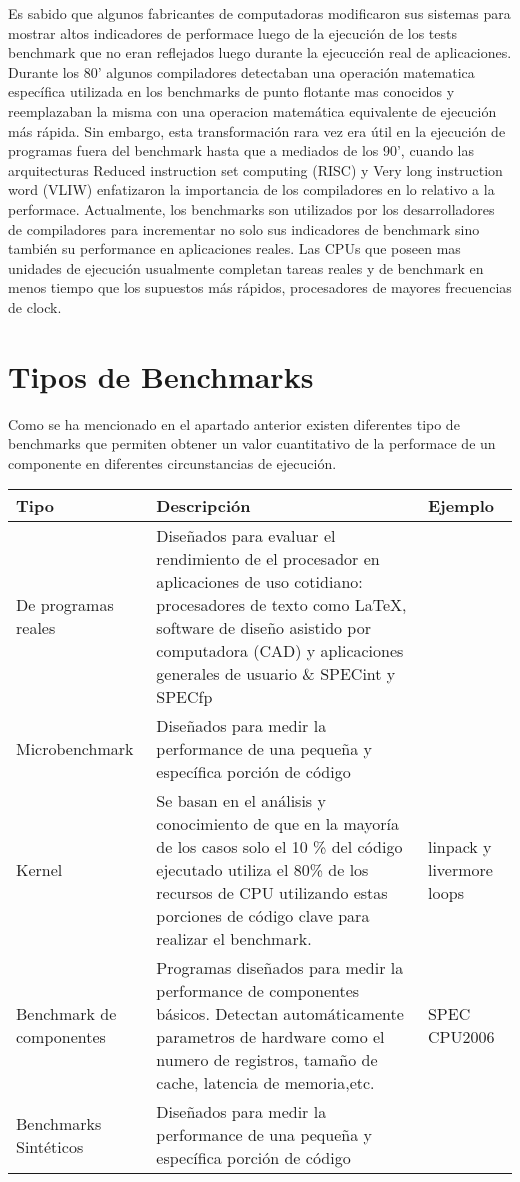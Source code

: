	Es sabido que algunos fabricantes de computadoras modificaron sus sistemas para mostrar altos indicadores de performace luego de la ejecución de los
	tests benchmark que no eran reflejados luego durante la ejecucción real de aplicaciones. Durante los 80' algunos compiladores detectaban una
	operación matematica específica utilizada en los benchmarks de punto flotante mas conocidos y reemplazaban la misma con una operacion matemática
	equivalente de ejecución más rápida. Sin embargo, esta transformación rara vez era útil en la ejecución de programas fuera del benchmark hasta que a
	mediados de los 90', cuando las arquitecturas Reduced instruction set computing (RISC) y Very long instruction word (VLIW) enfatizaron la importancia
	de los compiladores en lo relativo a la performace. Actualmente, los benchmarks son utilizados por los desarrolladores de compiladores para
	incrementar no solo sus indicadores de benchmark sino también su performance en aplicaciones reales. Las CPUs que poseen mas unidades de ejecución
	usualmente completan tareas reales y de benchmark en menos tiempo que los supuestos más rápidos, procesadores de mayores frecuencias de clock.
	
	\section{Tipos de Benchmarks}
	Como se ha mencionado en el apartado anterior existen diferentes tipo de benchmarks que permiten obtener un valor cuantitativo de la performace de un
	componente en diferentes circunstancias de ejecución.
	
		\begin{tabular}{ p{2.5cm} p{8cm} p{3cm} }
		\hline 
		\rowcolor[gray]{0.8} Tipo & Descripción & Ejemplo \\
		\hline
		De programas reales  &  Diseñados para evaluar el rendimiento de el procesador en aplicaciones de uso cotidiano: procesadores de texto
		como \LaTeX, software de diseño asistido por computadora (CAD) y aplicaciones generales de usuario \& SPECint y SPECfp\\
		\hline
		Microbenchmark  &  Diseñados para medir la performance de una pequeña y específica porción de código \\
		\hline
		Kernel			&  Se basan en el análisis y conocimiento de que en la mayoría de los casos solo el 10 \% del código ejecutado utiliza el 80\% de los
		recursos de CPU utilizando estas porciones de código clave para realizar el benchmark.\cite{EtiquetaBM01} & linpack y livermore loops\\
		\hline
		Benchmark de componentes & Programas diseñados para medir la performance de componentes básicos. Detectan automáticamente parametros de hardware
		como el numero de registros, tamaño de cache, latencia de memoria,etc. &  SPEC CPU2006\\
		\hline
		Benchmarks Sintéticos  &  Diseñados para medir la performance de una pequeña y específica porción de código &  \\
		\hline
		
		\end{tabular}
	
